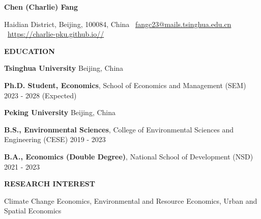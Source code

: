 \documentclass[UTF8]{ctexbook}
\begin{document}
\begin{center}
    \textbf{Chen (Charlie) Fang}\\ 
    \hrulefill
\end{center}

\begin{center}
    Haidian District, Beijing, 100084, China \textbullet \ \href{mailto:fangc23@mails.tsinghua.edu.cn}{fangc23@mails.tsinghua.edu.cn} \textbullet \ \href{https://charlie-pku.github.io//}{https://charlie-pku.github.io//}
\end{center}

\vspace{0.5pt}

\begin{center}
    \textbf{EDUCATION}
\end{center}
\textbf{Tsinghua University} \hfill Beijing, China



\quad \textbf{Ph.D. Student, Economics}, School of Economics and Management (SEM) \hfill 2023 - 2028 (Expected)


\vspace{12pt}

\textbf{Peking University}  \hfill Beijing, China

\quad \textbf{B.S., Environmental Sciences}, College of Environmental Sciences and Engineering (CESE) \hfill	2019 - 2023

\quad \textbf{B.A., Economics (Double Degree)}, National School of Development (NSD) \hfill 2021 - 2023

\vspace{12pt}




\begin{center}
    \textbf{RESEARCH INTEREST}
\end{center}

Climate Change Economics, Environmental and Resource Economics, Urban and Spatial Economics

\vspace{12pt}
\end{document}
